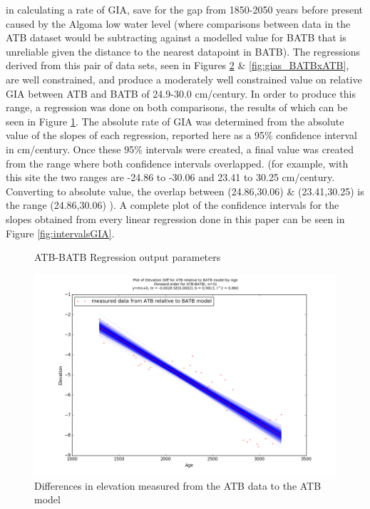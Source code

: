  in calculating a rate of GIA, save for the gap from 1850-2050 years before
 present caused by the Algoma low water level (where comparisons between data in the ATB dataset would be
 subtracting against a modelled value for BATB that is unreliable given
 the distance to the nearest datapoint in BATB). The regressions derived from this pair of data sets,
 seen in Figures \ref{fig:gias_ATBxBATB} \& \ref{fig:gias_BATBxATB}, are well
 constrained, and produce a moderately well constrained value on relative GIA
 between ATB and BATB of 24.9-30.0 cm/century. In order to produce this range, a
 regression was done on both comparisons, the results of which can be seen in
 Figure \ref{fig:ATBxBATB_regression}. The absolute rate of GIA was determined from the
 absolute value of the slopes of each regression, reported here as a 95\% confidence interval
 in cm/century. Once these 95\% intervals were created, a final value was created
 from the range where both confidence intervals overlapped. (for example, with this
 site the two ranges are -24.86 to -30.06 and 23.41 to 30.25 cm/century. Converting
 to absolute value, the overlap between (24.86,30.06) \& (23.41,30.25) is the range
 (24.86,30.06) ). A complete plot of the confidence intervals
 for the slopes obtained from every linear regression done in this paper can be seen in Figure \ref{fig:intervalsGIA}. \\


\begin{figure}[H]
	\begin{flushleft}
	\end{flushleft}
	\caption{ATB-BATB Regression output parameters}
	\label{fig:ATBxBATB_regression}
\end{figure}

\newpage

\begin{figure}[H]
	\includegraphics[width=0.9\linewidth]{data/bothNonZero/withinSeventyFivePercent/gias/theGIA_ATB_relative_to_BATB.png}
	\caption{Differences in elevation measured from the ATB data to the ATB model}
	\label{fig:gias_ATBxBATB}
\end{figure}



